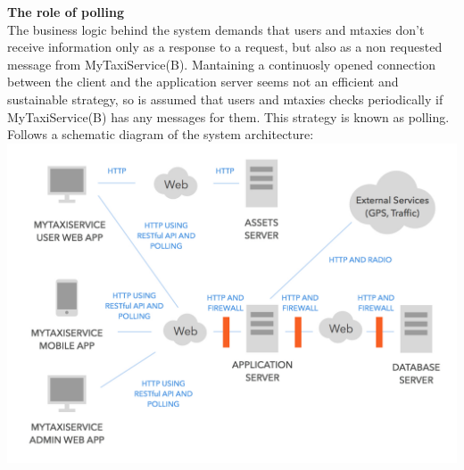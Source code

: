 \documentclass[11pt,titlepage]{article} %
\begin{document}
        \textbf{The role of polling}\hfill \\
        The business logic behind the system demands that users and mtaxies don't  receive information only as a response to a request, but
        also as a non requested message from MyTaxiService(B). Mantaining a continuosly opened connection between the client and the application server
        seems not an efficient and sustainable strategy, so is assumed that users and mtaxies checks periodically if MyTaxiService(B) has any messages
        for them. This strategy is known as polling.\newline
        \newpage
        Follows a schematic diagram of the system architecture:\newline
        \includegraphics[scale=0.3]{Arch.jpg}
 
\newpage
\end{document}
